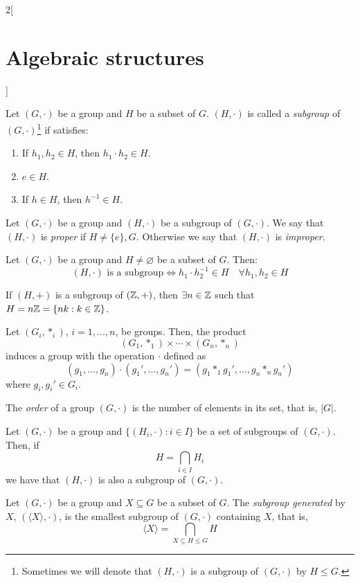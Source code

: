 \documentclass[../../../main_math.tex]{subfiles}
\begin{document}
\begin{multicols}{2}[\section{Algebraic structures}]
  \begin{definition}[Subgroup]
    Let $(G,\cdot)$ be a group and $H$ be a subset of $G$. $(H,\cdot)$ is called a \emph{subgroup} of $(G,\cdot)$\footnote{Sometimes we will denote that $(H,\cdot)$ is a subgroup of $(G,\cdot)$ by $H\leq G$.} if satisfies:
    \begin{enumerate}
      \item If $h_1,h_2\in H$, then $h_1\cdot h_2\in H$.
      \item $e\in H$.
      \item If $h\in H$, then $h^{-1}\in H$.
    \end{enumerate}
  \end{definition}
  \begin{definition}
    Let $(G,\cdot)$ be a group and $(H,\cdot)$ be a subgroup of $(G,\cdot)$. We say that $(H,\cdot)$ is \emph{proper} if $H\ne\{e\},G$. Otherwise we say that $(H,\cdot)$ is \emph{improper}.
  \end{definition}
  \begin{proposition}
    Let $(G,\cdot)$ be a group and $H\ne\varnothing$ be a subset of $G$. Then: $$(H,\cdot)\text{ is a subgroup}\iff h_1\cdot h_2^{-1}\in H\quad\forall h_1,h_2\in H$$
  \end{proposition}
  \begin{proposition}
    If $(H,+)$ is a subgroup of $(\mathbb{Z} ,+)$, then $\exists n\in\mathbb{Z} $ such that $H=n\mathbb{Z} =\{nk:k\in\mathbb{Z} \}$.
  \end{proposition}
  \begin{proposition}
    Let $(G_i,*_i)$, $i=1,\ldots, n$, be groups. Then, the product $$(G_1,*_1)\times\cdots\times(G_n,*_n)$$ induces a group with the operation $\cdot$ defined as $$(g_1,\ldots,g_n)\cdot(g_1',\ldots,g_n')=(g_1*_1g_1',\ldots,g_n*_ng_n')$$ where $g_i,g_i'\in G_i$.
  \end{proposition}
  \begin{definition}
    The \emph{order} of a group $(G,\cdot)$ is the number of elements in its set, that is, $|G|$.
  \end{definition}
  \begin{lemma}
    Let $(G,\cdot)$ be a group and $\{(H_i,\cdot):i\in I\}$ be a set of subgroups of $(G,\cdot)$. Then, if $$H=\displaystyle\bigcap_{i\in I}H_i$$ we have that $(H,\cdot)$ is also a subgroup of $(G,\cdot)$.
  \end{lemma}
  \begin{definition}
    Let $(G,\cdot)$ be a group and $X\subseteq G$ be a subset of $G$. The \emph{subgroup generated} by $X$, $(\langle X\rangle,\cdot)$, is the smallest subgroup of $(G,\cdot)$ containing $X$, that is, $$\langle X\rangle=\bigcap_{X\subseteq H\leq G}H$$

\end{definition}
\end{multicols}
\end{document}
